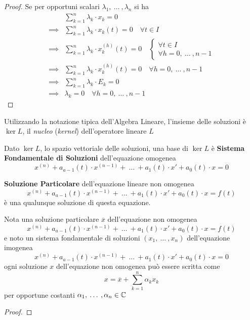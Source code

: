 \begin{proposition}
\begin{proof}
		Se per opportuni scalari $\lambda_1,\:\dotsc\:,\lambda_n$ si ha
		\begin{align*}
			& \sum\limits_{k=1}^{n} \lambda_k \cdot x_k = 0\\
			\implies & \sum\limits_{k=1}^{n} \lambda_k \cdot x_k(t) = 0 \quad \forall t \in I\\
			\implies & \sum\limits_{k=1}^{n} \lambda_k \cdot x_k^{(h)}(t) = 0 \quad \begin{cases}\forall t \in I\\\forall h = 0,\:\dotsc\:, n-1	\end{cases}\\
			\implies & \sum\limits_{k=1}^{n} \lambda_k \cdot x_k^{(h)}(t) = 0 \quad \forall h = 0,\:\dotsc\:, n-1\\
			\implies & \sum\limits_{k=1}^{n} \lambda_k \cdot E_k = 0\\
			\implies & \lambda_k = 0\quad \forall h = 0,\:\dotsc\:, n-1
		\end{align*}
	\end{proof}
\end{proposition}

\begin{note}
	Utilizzando la notazione tipica dell'Algebra Lineare, l'insieme delle soluzioni è $\ker L$, il \textit{nucleo} (\textit{kernel}) dell'operatore lineare $L$
\end{note}

\begin{definition}
	Dato $\ker L$, lo spazio vettoriale delle soluzioni, una base di $\ker L$ è \textbf{Sistema Fondamentale di Soluzioni} dell'equazione omogenea
	$$x^{(n)} + a_{a-1}(t) \cdot x^{(n-1)} +\:\ldots\:+ a_1(t) \cdot x' + a_0(t) \cdot x = 0$$
\end{definition}
\begin{definition}
	\textbf{Soluzione Particolare} dell'equazione lineare non omogenea
	$$x^{(n)} + a_{a-1}(t) \cdot x^{(n-1)} +\:\ldots\:+ a_1(t) \cdot x' + a_0(t) \cdot x = f(t)$$
	è una qualunque soluzione di questa equazione.
\end{definition}

\begin{proposition}
	Nota una soluzione particolare $\overline{x}$ dell'equazione non omogenea
	$$x^{(n)} + a_{a-1}(t) \cdot x^{(n-1)} +\:\ldots\:+ a_1(t) \cdot x' + a_0(t) \cdot x = f(t)$$
	e noto un sistema fondamentale di soluzioni $(x_1,\:\dotsc\:,x_n)$ dell'equazione imogenea
	$$x^{(n)} + a_{a-1}(t) \cdot x^{(n-1)} +\:\ldots\:+ a_1(t) \cdot x' + a_0(t) \cdot x = 0$$
	ogni soluzione $x$ dell'equazione non omogenea può essere scritta come
	$$x = \overline{x} + \sum\limits_{k=1}^n \alpha_k x_k$$
	per opportune costanti $\alpha_1,\:\dotsc\:,\alpha_n \in \mathbb{C}$
	\begin{proof}
	\end{proof}
\end{proposition}


